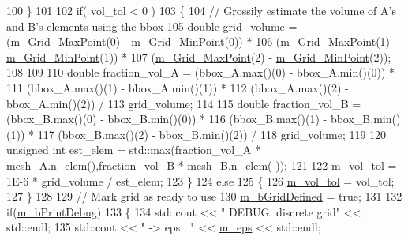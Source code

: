 \begin{DoxyCode}
100     \}
101 
102     \textcolor{keywordflow}{if}( vol\_tol < 0 )
103     \{
104         \textcolor{comment}{// Grossily estimate the volume of A's and B's elements using the bbox}
105         \textcolor{keywordtype}{double} grid\_volume    =     (\hyperlink{classcarl_1_1_stitch___meshes_a06ac179f70188b5fed34f32e88a37787}{m\_Grid\_MaxPoint}(0) - 
      \hyperlink{classcarl_1_1_stitch___meshes_a7bf918ef98a9bc853afe749c44d35f35}{m\_Grid\_MinPoint}(0)) *
106                                     (\hyperlink{classcarl_1_1_stitch___meshes_a06ac179f70188b5fed34f32e88a37787}{m\_Grid\_MaxPoint}(1) - 
      \hyperlink{classcarl_1_1_stitch___meshes_a7bf918ef98a9bc853afe749c44d35f35}{m\_Grid\_MinPoint}(1)) *
107                                     (\hyperlink{classcarl_1_1_stitch___meshes_a06ac179f70188b5fed34f32e88a37787}{m\_Grid\_MaxPoint}(2) - 
      \hyperlink{classcarl_1_1_stitch___meshes_a7bf918ef98a9bc853afe749c44d35f35}{m\_Grid\_MinPoint}(2));
108 
109 
110         \textcolor{keywordtype}{double} fraction\_vol\_A =     (bbox\_A.max()(0) - bbox\_A.min()(0)) *
111                                     (bbox\_A.max()(1) - bbox\_A.min()(1)) *
112                                     (bbox\_A.max()(2) - bbox\_A.min()(2)) /
113                                     grid\_volume;
114 
115         \textcolor{keywordtype}{double} fraction\_vol\_B =     (bbox\_B.max()(0) - bbox\_B.min()(0)) *
116                                     (bbox\_B.max()(1) - bbox\_B.min()(1)) *
117                                     (bbox\_B.max()(2) - bbox\_B.min()(2)) /
118                                     grid\_volume;
119 
120         \textcolor{keywordtype}{unsigned} \textcolor{keywordtype}{int} est\_elem =   std::max(fraction\_vol\_A * mesh\_A.n\_elem(),fraction\_vol\_B * mesh\_B.n\_elem(
      ));
121 
122         \hyperlink{classcarl_1_1_stitch___meshes_a6c5e1728cc1118b1052f78f87c560c91}{m\_vol\_tol} = 1E-6 * grid\_volume / est\_elem;
123     \}
124     \textcolor{keywordflow}{else}
125     \{
126         \hyperlink{classcarl_1_1_stitch___meshes_a6c5e1728cc1118b1052f78f87c560c91}{m\_vol\_tol} = vol\_tol;
127     \}
128 
129     \textcolor{comment}{// Mark grid as ready to use}
130     \hyperlink{classcarl_1_1_stitch___meshes_a9bc08080ddc1f39ee4456aff9eeca725}{m\_bGridDefined} = \textcolor{keyword}{true};
131 
132     \textcolor{keywordflow}{if}(\hyperlink{classcarl_1_1_stitch___meshes_aeb94b2d2b28624414fd00e02ec9a97e0}{m\_bPrintDebug})
133     \{
134         std::cout << \textcolor{stringliteral}{"    DEBUG: discrete grid"} << std::endl;
135         std::cout << \textcolor{stringliteral}{" -> eps             : "} << \hyperlink{classcarl_1_1_stitch___meshes_a1cbb52478197125ed915538dc9c717c2}{m\_eps} << std::endl;

\end{DoxyCode}
